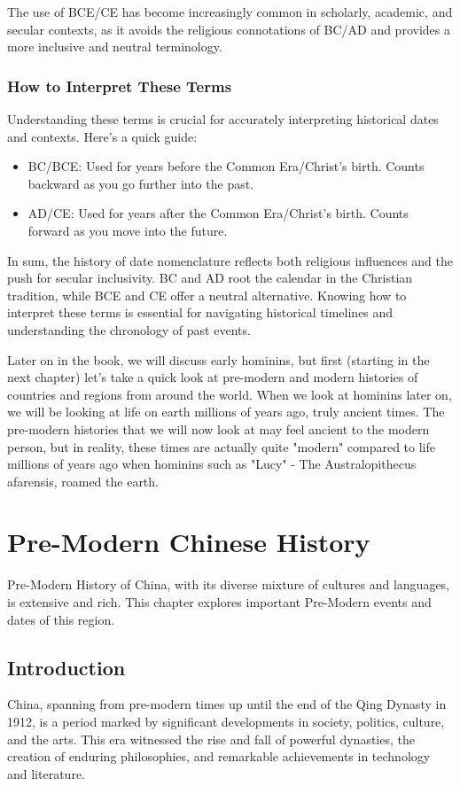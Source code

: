 \documentclass{book}
\begin{document}
The use of BCE/CE has become increasingly common in scholarly, academic, and secular contexts, as it avoids the religious connotations of BC/AD and provides a more inclusive and neutral terminology.

\subsection*{How to Interpret These Terms}
Understanding these terms is crucial for accurately interpreting historical dates and contexts. Here’s a quick guide:

\begin{itemize}
    \item BC/BCE: Used for years before the Common Era/Christ’s birth. Counts backward as you go further into the past.
    \item AD/CE: Used for years after the Common Era/Christ’s birth. Counts forward as you move into the future.
\end{itemize}

In sum, the history of date nomenclature reflects both religious influences and the push for secular inclusivity. BC and AD root the calendar in the Christian tradition, while BCE and CE offer a neutral alternative. Knowing how to interpret these terms is essential for navigating historical timelines and understanding the chronology of past events.

Later on in the book, we will discuss early hominins, but first (starting in the next chapter) let's take a quick look at pre-modern and modern histories of countries and regions from around the world. When we look at hominins later on, we will be looking at life on earth millions of years ago, truly ancient times. The pre-modern histories that we will now look at may feel ancient to the modern person, but in reality, these times are actually quite "modern" compared to life millions of years ago when hominins such as "Lucy" - The Australopithecus afarensis, roamed the earth. 

\chapter{Pre-Modern Chinese History}
Pre-Modern History of China, with its diverse mixture of cultures and languages, is extensive and rich. This chapter explores important Pre-Modern events and dates of this region.

\section{Introduction}
China, spanning from pre-modern times up until the end of the Qing Dynasty in 1912, is a period marked by significant developments in society, politics, culture, and the arts. This era witnessed the rise and fall of powerful dynasties, the creation of enduring philosophies, and remarkable achievements in technology and literature.
\end{document}
